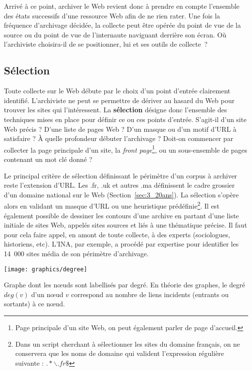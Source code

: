 \documentclass[symmetric,justified,marginals=raggedouter]{tufte-book}
\begin{document}
Arrivé à ce point, archiver le Web revient donc à prendre en compte l'ensemble des états successifs d'une ressource Web afin de ne rien rater. Une fois la fréquence d'archivage décidée, la collecte peut être opérée du point de vue de la source ou du point de vue de l'internaute naviguant derrière son écran. Où l'archiviste choisira-il de se positionner, lui et ses outils de collecte~?

\subsection{Sélection}

\noindent Toute collecte sur le Web débute par le choix d'un point d'entrée clairement identifié. L'archiviste ne peut se permettre de dériver au hasard du Web pour trouver les sites qui l'intéressent. La \textbf{sélection} désigne donc l'ensemble des techniques mises en place pour définir ce ou ces points d'entrée. S'agit-il d'un site Web précis ? D'une liste de pages Web ? D'un masque ou d'un motif d'URL à satisfaire ? À quelle profondeur débuter l'archivage ? Doit-on commencer par collecter la page principale d'un site, la \textit{front page}\footnote{\RaggedOuter Page principale d'un site Web, on peut également parler de page d'accueil.}, ou un sous-ensemble de pages contenant un mot clé donné ?     

Le principal critère de sélection définissant le périmètre d'un corpus à archiver reste l'extension d'URL. Les .fr, .uk et autres .ma définissent le cadre grossier d'un domaine national sur le Web (Section~\ref{sec:3_20ans}). La sélection s'opère alors en validant un masque d'URL ou une heuristique prédéfinie\footnote{\RaggedOuter Dans un script cherchant à sélectionner les sites du domaine français, on ne conservera que les noms de domaine qui valident l'expression régulière suivante : $.*\backslash.fr\$$}. Il est également possible de dessiner les contours d'une archive en partant d'une liste initiale de sites Web, appelés sites sources et liés à une thématique précise. Il faut pour cela faire appel, en amont de toute collecte, à des experts (sociologues, historiens, etc). L'INA, par exemple, a procédé par expertise pour identifier les 14~000 sites média de son périmètre d'archivage. 

\begin{marginfigure}%
  \texttt{[image: graphics/degree]}
  \caption{Graphe dont les nœuds sont labellisés par degré. En théorie des graphes, le degré $deg(v)$ d'un nœud $v$ correspond au nombre de liens incidents (entrants ou sortants) à ce nœud.}
  \label{fig:degree}
\end{marginfigure} 
\end{document}
